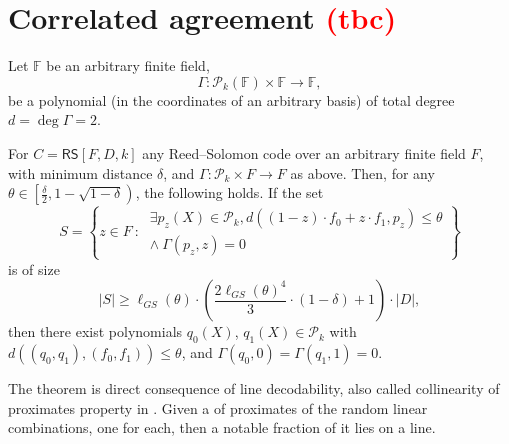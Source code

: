 \section{Correlated agreement \textcolor{red}{(tbc)}}
\label{s:CAT}

Let $\mathbb F$ be an arbitrary finite field, 
\[
\Gamma: \mathscr P_k(\mathbb F) \times \mathbb F \longrightarrow \mathbb F, %
\]
be a polynomial (in the coordinates of an arbitrary basis) of total degree $d = \deg \Gamma = 2$.


\begin{thm} 
\label{thm:CAT:constrained}
For $C = \mathsf{RS}[F, D, k]$ any Reed--Solomon code over an arbitrary finite field $F$, with minimum distance $\delta$, and  $\Gamma:\mathscr P_k\times F\longrightarrow F$ as above.
Then, for any $\theta \in \left[\frac{\delta}{2}, 1 -\sqrt{1-\delta}\right)$, the following holds.
If the set
\[
S = \left\{z \in F\::\:  
    \begin{matrix}
    \exists p_z(X) \in \mathscr P_k,
        d((1-z)\cdot f_0 + z\cdot f_1, p_z) \leq \theta 
        \\
        \wedge \:\Gamma(p_z, z) = 0
    \end{matrix}
\right\}
\]
is of size 
\[
|S| \geq  \ell_{GS}(\theta)\cdot \left( 
\frac{2\ell_{GS}(\theta)^4}{3}\cdot (1 - \delta) %
+ 1
\right) \cdot |D|,
\]
then there exist polynomials $q_0(X)$, $q_1(X)\in\mathscr P_k$ with $d((q_0,q_1),(f_0,f_1))\leq \theta$, and $\Gamma(q_0,0)= \Gamma(q_1,1) = 0$. 
\end{thm}

The theorem is direct consequence of line decodability, also called collinearity of proximates property in \cite{Basefold:LDR}.
Given a of proximates of the random linear combinations, one for each, then a notable fraction of it lies on a line.
